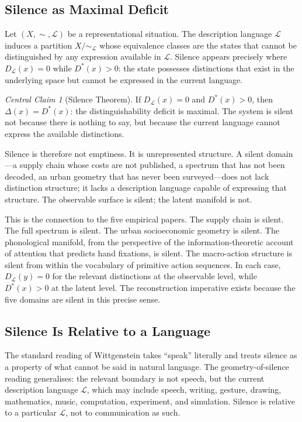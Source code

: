 \documentclass[12pt, letterpaper]{article}
\theoremstyle{remark}
\newtheorem*{claim}{Central Claim}
\begin{document}
\subsection{Silence as Maximal Deficit}

Let $(X, {\sim}, \mathcal{L})$ be a representational situation.  The
description language $\mathcal{L}$ induces a partition $X/{\sim_{\mathcal{L}}}$
whose equivalence classes are the states that cannot be distinguished by
any expression available in $\mathcal{L}$.  Silence appears precisely where
$D_{\mathcal{L}}(x) = 0$ while $D^*(x) > 0$: the state possesses distinctions
that exist in the underlying space but cannot be expressed in the current
language.

\begin{claim}[Silence Theorem]
If $D_{\mathcal{L}}(x) = 0$ and $D^*(x) > 0$, then
$\Delta(x) = D^*(x)$: the distinguishability deficit is maximal.
The system is silent not because there is nothing to say, but because the
current language cannot express the available distinctions.
\end{claim}

Silence is therefore not emptiness.  It is unrepresented structure.  A
silent domain---a supply chain whose costs are not published, a spectrum
that has not been decoded, an urban geometry that has never been
surveyed---does not lack distinction structure; it lacks a description
language capable of expressing that structure.  The observable surface is
silent; the latent manifold is not.

This is the connection to the five empirical papers.  The supply chain
is silent.  The full spectrum is silent.  The urban socioeconomic geometry
is silent.  The phonological manifold, from the perspective of the
information-theoretic account of attention that predicts hand fixations,
is silent.  The macro-action structure is silent from within the vocabulary
of primitive action sequences.  In each case, $D_{\mathcal{L}}(y) = 0$
for the relevant distinctions at the observable level, while
$D^*(x) > 0$ at the latent level.  The reconstruction imperative exists
because the five domains are silent in this precise sense.

\subsection{Silence Is Relative to a Language}

The standard reading of Wittgenstein takes ``speak'' literally and
treats silence as a property of what cannot be said in natural language.
The geometry-of-silence reading generalises: the relevant boundary is
not speech, but the current description language $\mathcal{L}$, which may
include speech, writing, gesture, drawing, mathematics, music, computation,
experiment, and simulation.  Silence is relative to a particular
$\mathcal{L}$, not to communication as such.
\end{document}
